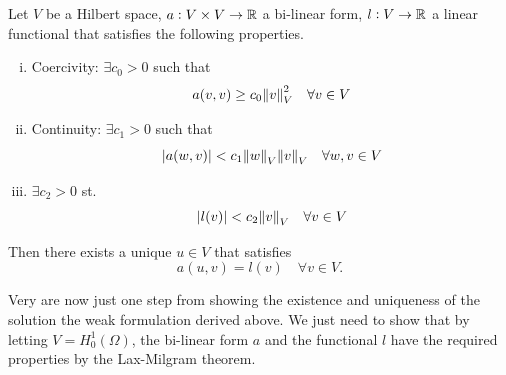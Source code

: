 \begin{theorem}
	Let $ V $ be a Hilbert space, $ a:V\times V \to \mathbb{R} $ a bi-linear form, $ l: V \to \mathbb{R} $ a linear functional that satisfies the following properties.
	\begin{enumerate}[(i)]
		\item Coercivity: $ \exists c_0>0$ such that 
		\[  {a(v,v)} \geq c_0 \norm{v}_V^2 \quad \forall v \in V \]
		\item Continuity: $ \exists c_1>0 $ such that
		\[ |a(w,v)| < c_1 \norm{w}_V\norm{v}_V \quad \forall w,v \in V \]
		\item $ \exists c_2 > 0 $ st.
		\[ |l(v)| < c_2 \norm{v}_V \quad \forall v \in V \]
	\end{enumerate}
	Then there exists a unique $ u \in V $ that satisfies
	\[ a(u,v) = l(v) \quad \forall v \in V. \]
\end{theorem}


Very are now just one step from showing the existence and uniqueness of the solution the weak formulation derived above. We just need to show that by letting $ V = H_0^1(\Omega) $, the bi-linear form $ a $ and the functional $ l $ have the required properties by the Lax-Milgram theorem. 



